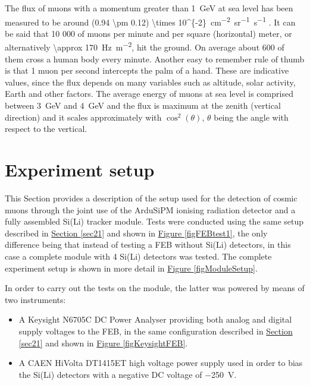 \par
The flux of muons with a momentum greater than \SI{1}{\giga\electronvolt} at sea level has been measured to be around \SI[parse-numbers=false]{(0.94 \pm 0.12) \times 10^{-2}}{\cm^{-2}.sr^{-1}.s^{-1}} \cite{tanabashi_2018_review, allkofer_1975_the}. It can be said that 10 000 of muons per minute and per square (horizontal) meter, or alternatively \SI{\approx 170}{\hertz\per\meter^{2}}, hit the ground. On average about 600 of them cross a human body every minute. Another easy to remember rule of thumb is that 1 muon per second intercepts the palm of a hand. These are indicative values, since the flux depends on many variables such as altitude, solar activity, Earth and other factors. The average energy of muons at sea level is comprised between \SI{3}{\giga\electronvolt} and \SI{4}{\giga\electronvolt} and the flux is maximum
at the zenith (vertical direction) and it scales approximately with $\cos^{2}(\theta)$, $\theta$ being the angle with respect to the vertical.


\section{Experiment setup}

This Section provides a description of the setup used for the detection of cosmic muons through the joint use of the ArduSiPM ionising radiation detector and a fully assembled Si(Li) tracker module. Tests were conducted using the same setup described in \hyperref[sec21]{Section \ref{sec21}} and shown in \hyperref[figFEBtest1]{Figure \ref{figFEBtest1}}, the only difference being that instead of testing a FEB without Si(Li) detectors, in this case a complete module with 4 Si(Li) detectors was tested. The complete experiment setup is shown in more detail in \hyperref[figModuleSetup]{Figure \ref{figModuleSetup}}.

\par
In order to carry out the tests on the module, the latter was powered by means of two instruments:

\begin{itemize}
    \itemsep0em
    \item A Keysight N6705C DC Power Analyser providing both analog and digital supply voltages to the FEB, in the same configuration described in \hyperref[sec21]{Section \ref{sec21}} and shown in \hyperref[figKeysightFEB]{Figure \ref{figKeysightFEB}}.
    \item A CAEN HiVolta DT1415ET high voltage power supply used in order to bias the Si(Li) detectors with a negative DC voltage of \SI{-250}{\volt}. 
\end{itemize}

